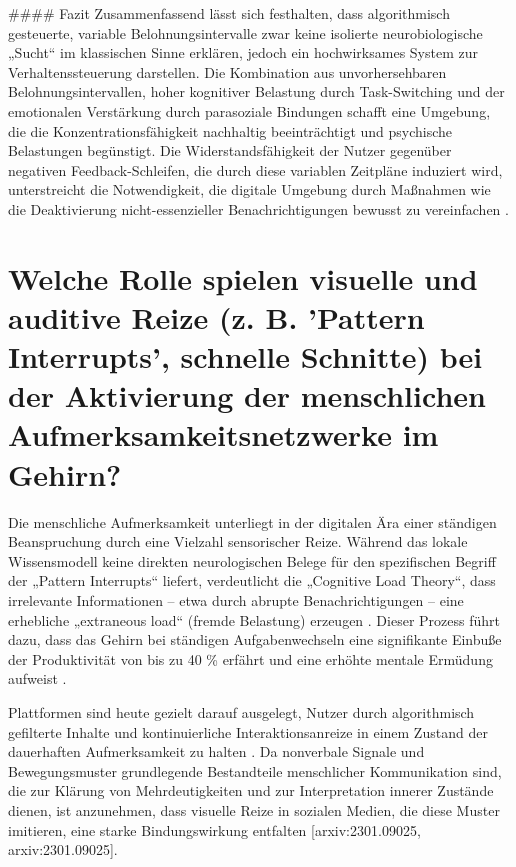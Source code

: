 \documentclass[11pt,a4paper]{article}
\begin{document}
\#\#\#\# Fazit Zusammenfassend lässt sich festhalten, dass algorithmisch gesteuerte, variable Belohnungsintervalle zwar keine isolierte neurobiologische „Sucht“ im klassischen Sinne erklären, jedoch ein hochwirksames System zur Verhaltenssteuerung darstellen. Die Kombination aus unvorhersehbaren Belohnungsintervallen, hoher kognitiver Belastung durch Task-Switching und der emotionalen Verstärkung durch parasoziale Bindungen schafft eine Umgebung, die die Konzentrationsfähigkeit nachhaltig beeinträchtigt und psychische Belastungen begünstigt. Die Widerstandsfähigkeit der Nutzer gegenüber negativen Feedback-Schleifen, die durch diese variablen Zeitpläne induziert wird, unterstreicht die Notwendigkeit, die digitale Umgebung durch Maßnahmen wie die Deaktivierung nicht-essenzieller Benachrichtigungen bewusst zu vereinfachen \autocite{grey_grey_d4bc9c0d0e8441ba90398520e73af07d,crossref_10_3758_bf03343141}.

\section{Welche Rolle spielen visuelle und auditive Reize (z. B. 'Pattern Interrupts', schnelle Schnitte) bei der Aktivierung der menschlichen Aufmerksamkeitsnetzwerke im Gehirn?}

Die menschliche Aufmerksamkeit unterliegt in der digitalen Ära einer ständigen Beanspruchung durch eine Vielzahl sensorischer Reize. Während das lokale Wissensmodell keine direkten neurologischen Belege für den spezifischen Begriff der „Pattern Interrupts“ liefert, verdeutlicht die „Cognitive Load Theory“, dass irrelevante Informationen – etwa durch abrupte Benachrichtigungen – eine erhebliche „extraneous load“ (fremde Belastung) erzeugen \autocite{grey_grey_d4bc9c0d0e8441ba90398520e73af07d}. Dieser Prozess führt dazu, dass das Gehirn bei ständigen Aufgabenwechseln eine signifikante Einbuße der Produktivität von bis zu 40 \% erfährt und eine erhöhte mentale Ermüdung aufweist \autocite{grey_grey_d4bc9c0d0e8441ba90398520e73af07d}.

Plattformen sind heute gezielt darauf ausgelegt, Nutzer durch algorithmisch gefilterte Inhalte und kontinuierliche Interaktionsanreize in einem Zustand der dauerhaften Aufmerksamkeit zu halten \autocite{grey_grey_3467cac0f11d4b1e86319128da218a3e,grey_grey_bbc8a51d8734471c850e8c2939fe8d32}. Da nonverbale Signale und Bewegungsmuster grundlegende Bestandteile menschlicher Kommunikation sind, die zur Klärung von Mehrdeutigkeiten und zur Interpretation innerer Zustände dienen, ist anzunehmen, dass visuelle Reize in sozialen Medien, die diese Muster imitieren, eine starke Bindungswirkung entfalten [arxiv:2301.09025, arxiv:2301.09025].
\end{document}

